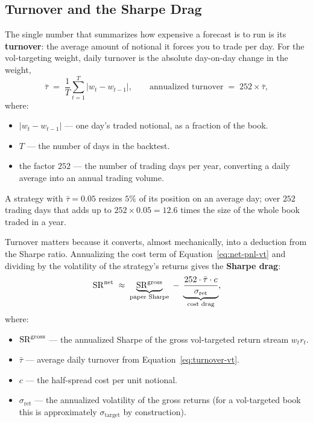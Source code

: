 \subsection{Turnover and the Sharpe Drag}
\label{subsec:turnover-drag}

The single number that summarizes how expensive a forecast is to run is its \textbf{turnover}: the average amount of notional it forces you to trade per day. For the vol-targeting weight, daily turnover is the absolute day-on-day change in the weight,
\begin{equation}
\label{eq:turnover-vt}
\bar\tau \;=\; \frac{1}{T}\sum_{t=1}^{T} |w_t - w_{t-1}|,
\qquad
\text{annualized turnover} \;=\; 252 \times \bar\tau,
\end{equation}
where:
\begin{itemize}[nosep]
  \item $|w_t - w_{t-1}|$ --- one day's traded notional, as a fraction of the book.
  \item $T$ --- the number of days in the backtest.
  \item the factor $252$ --- the number of trading days per year, converting a daily average into an annual trading volume.
\end{itemize}
A strategy with $\bar\tau = 0.05$ resizes $5\%$ of its position on an average day; over $252$ trading days that adds up to $252 \times 0.05 = 12.6$ times the size of the whole book traded in a year.

Turnover matters because it converts, almost mechanically, into a deduction from the Sharpe ratio. Annualizing the cost term of Equation~\eqref{eq:net-pnl-vt} and dividing by the volatility of the strategy's returns gives the \textbf{Sharpe drag}:
\begin{equation}
\label{eq:sharpe-drag}
\operatorname{SR}^{\text{net}} \;\approx\; \underbrace{\operatorname{SR}^{\text{gross}}}_{\text{paper Sharpe}} \;-\; \underbrace{\frac{252 \cdot \bar\tau \cdot c}{\sigma_{\text{ret}}}}_{\text{cost drag}},
\end{equation}
where:
\begin{itemize}[nosep]
  \item $\operatorname{SR}^{\text{gross}}$ --- the annualized Sharpe of the gross vol-targeted return stream $w_t r_t$.
  \item $\bar\tau$ --- average daily turnover from Equation~\eqref{eq:turnover-vt}.
  \item $c$ --- the half-spread cost per unit notional.
  \item $\sigma_{\text{ret}}$ --- the annualized volatility of the gross returns (for a vol-targeted book this is approximately $\sigma_{\text{target}}$ by construction).
\end{itemize}

